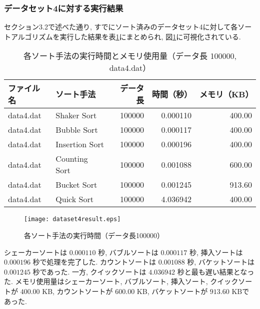 \documentclass[a4j, 11pt]{jarticle}
\begin{document}
\subsubsection{データセット4に対する実行結果}
セクション3.2で述べた通り, すでにソート済みのデータセット4に対して各ソートアルゴリズムを実行した結果を表\ref{dataset4allresult}にまとめられ, 図\ref{dataset4allresultgraph}に可視化されている.
\begin{table}[H]
  \centering
  \caption{各ソート手法の実行時間とメモリ使用量（データ長 100000, data4.dat）}\label{dataset4allresult}
  \begin{tabular}{|l|l|r|r|r|}
    \hline
    \textbf{ファイル名} & \textbf{ソート手法} & \textbf{データ長} & \textbf{時間（秒）} & \textbf{メモリ（KB）} \\
    \hline
    data4.dat & Shaker Sort    & 100000 & 0.000110  & 400.00 \\
    data4.dat & Bubble Sort    & 100000 & 0.000117  & 400.00 \\
    data4.dat & Insertion Sort & 100000 & 0.000196  & 400.00 \\
    data4.dat & Counting Sort  & 100000 & 0.001088  & 600.00 \\
    data4.dat & Bucket Sort    & 100000 & 0.001245  & 913.60 \\
    data4.dat & Quick Sort     & 100000 & 4.036942  & 400.00 \\
    \hline
  \end{tabular}
\end{table}
\begin{figure}[H]
  \centering
  \texttt{[image: dataset4result.eps]}
  \caption{各ソート手法の実行時間（データ長100000）}\label{dataset4allresultgraph}
\end{figure}
シェーカーソートは $0.000110$ 秒, バブルソートは $0.000117$ 秒, 挿入ソートは $0.000196$ 秒で処理を完了した. カウントソートは $0.001088$ 秒, バケットソートは $0.001245$ 秒であった. 一方, クイックソートは $4.036942$ 秒と最も遅い結果となった. メモリ使用量はシェーカーソート, バブルソート, 挿入ソート, クイックソートが $400.00$ KB, カウントソートが $600.00$ KB, バケットソートが $913.60$ KBであった. \
\end{document}
